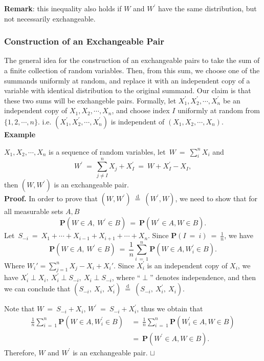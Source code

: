 \documentclass[12pt]{article}
\newcommand\qed{\hfill\hbox{\rlap{$\sqcap$}$\sqcup$}}
\newcommand{\eq }{\: = \:}
\theoremstyle{nonumberplain}
\begin{document}
\medskip
\noindent
\textbf{Remark}: this inequality also holds if $W$ and $W^{\prime}$ have the same distribution, but not necessarily exchangeable.


\subsubsection{Construction of an Exchangeable Pair}

The general idea for the construction of an exchangeable pairs to take the sum of a finite collection of random variables. Then, from this sum, we choose one of the summands uniformly at random, and replace it with an independent copy of a variable with identical distribution to the original summand. Our claim is that these two sums will be exchangeble pairs. Formally, let $X_{1}^{\prime}, X_{2}^{\prime}, \cdots, X_{n}^{\prime}$ be an independent copy of $X_{1}, X_{2}, \cdots, X_{n}$, and choose index $I$ uniformly at random from $\{1,2,\cdots,n\}$. i.e. $(X_{1}^{\prime}, X_{2}^{\prime}, \cdots, X_{n}^{\prime})$ is independent of $(X_{1}, X_{2}, \cdots, X_{n})$.\\

\pagebreak
\textbf{Example}

\noindent
$X_{1}, X_{2}, \cdots, X_{n}$ is a sequence of random variables, let\ $W\eq \sum_{i}^{n} X_{i}$ and 
$$
W^{\prime}\eq  \sum_{j\neq I}^{n} X_{j} + X_{I}^{\prime}\eq W+X_{I}^{\prime}-X_{I}, 
$$ 
then $(W,W^{\prime})$ is an exchangeable pair.\\
\textbf{Proof.} In order to prove that $(W,W^{\prime})\overset{\text{d}}{\eq }(W^{\prime},W)$, we need to show that for all measurable sets $A, B$
$$
\textbf{P}(W\in A,\ W^{\prime}\in B)\eq \textbf{P}(W^{\prime}\in A, W\in B).
$$
Let\ $S_{-i}\eq X_{1}+\cdots+X_{i-1}+X_{i+1}+\cdots+X_{n}$. Since $\textbf{P}(I\eq i)\eq \frac{1}{n}$, we have
$$
\textbf{P}(W\in A,\ W^{\prime}\in B)\eq \frac{1}{n} \sum_{i\eq 1}^{n} \textbf{P}(W\in A, W_{i}^{\prime}\in B). 
$$
Where $W_i' = \sum_{j = 1}^{n} X_j - X_i + X_i'$.
Since $X_{i}^{\prime}$ is an independent copy of $X_{i}$, we have
$X_{i}^{\prime}\perp X_{i},\ X_{i}^{\prime}\perp S_{-i},\ X_{i}\perp S_{-i}$, where ``$\perp$'' denotes independence, and then we can conclude that $(S_{-i},\ X_{i},\ X_{i}^{\prime}) \overset{\text{d}}{\eq }(S_{-i},\ X_{i}^{\prime},\ X_{i})$.

\noindent
Note that $W\eq S_{-i}+X_{i}$, $W^{\prime}\eq S_{-i}+X_{i}^{\prime}$, thus we obtain that
\begin{align*}
\frac{1}{n} \sum_{i\eq 1}^{n} \textbf{P}(W\in A, W_{i}^{\prime}\in B)&\eq \frac{1}{n} \sum_{i\eq 1}^{n} \textbf{P}(W_{i}^{\prime}\in A, W\in B)\\
&\eq \textbf{P}(W^{\prime}\in A, W\in B).
\end{align*}
Therefore, $W$ and $W^{\prime}$ is an exchangeable pair.
\qed
\end{document}
